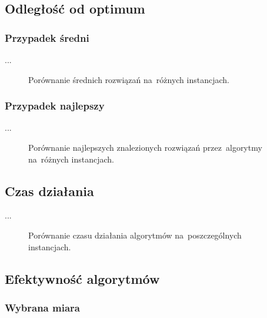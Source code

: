 \subsection{Odległość od optimum}

\subsubsection{Przypadek średni}

...

\begin{figure}
\begin{center}
\end{center}
\caption{Porównanie średnich rozwiązań na~różnych instancjach.}
\label{fig:avg}
\end{figure}

\subsubsection{Przypadek najlepszy}

...

\begin{figure}
\begin{center}
\end{center}
\caption{Porównanie najlepszych znalezionych rozwiązań przez~algorytmy na~różnych instancjach.}
\label{fig:best}
\end{figure}

\subsection{Czas działania}

...

\begin{figure}
\begin{center}
\end{center}
\caption{Porównanie czasu działania algorytmów na~poszczególnych instancjach.}
\label{fig:best}
\end{figure}

\subsection{Efektywność algorytmów}

\subsubsection{Wybrana miara}

